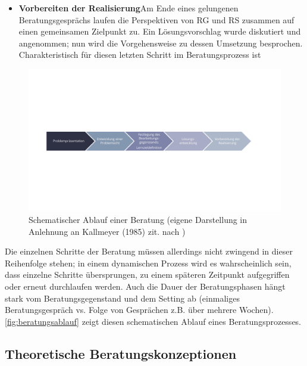 \documentclass[
  twoside,
  parskip=half-,
  paper=176mm:246mm,
  BCOR=14mm,
  DIV=14,
]{scrreprt}
\begin{document}
\begin{itemize}
  \item \textbf{Vorbereiten der Realisierung}\quad Am Ende eines gelungenen Beratungsgesprächs laufen die Perspektiven von RG und RS zusammen auf einen gemeinsamen Zielpunkt zu. Ein Lösungsvorschlag wurde diskutiert und angenommen; nun wird die Vorgehensweise zu dessen Umsetzung besprochen. Charakteristisch für diesen letzten Schritt im Beratungsprozess ist 
\end{itemize}

\begin{figure}
  \centering
  \includegraphics[width=\textwidth]{Grafiken/Beratungsablauf.pdf}
  \caption{Schematischer Ablauf einer Beratung (eigene Darstellung in Anlehnung an Kallmeyer (1985) zit. nach \textcite[179]{dinkelaker})}
  \label{fig:beratungsablauf}
\end{figure}

Die einzelnen Schritte der Beratung müssen allerdings nicht zwingend in dieser Reihenfolge stehen; in einem dynamischen Prozess wird es wahrscheinlich sein, dass einzelne Schritte übersprungen, zu einem späteren Zeitpunkt aufgegriffen oder erneut durchlaufen werden. Auch die Dauer der Beratungsphasen hängt stark vom Beratungsgegenstand und dem Setting ab (einmaliges Beratungsgespräch vs. Folge von Gesprächen z.B. über mehrere Wochen). \autoref{fig:beratungsablauf} zeigt diesen schematischen Ablauf eines Beratungsprozesses.

\subsection{Theoretische Beratungskonzeptionen}
\end{document}
